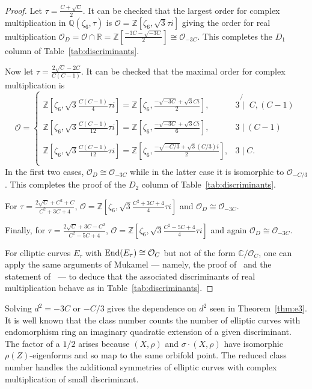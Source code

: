 \documentclass[a4paper,11pt]{amsart}
\numberwithin{equation}{section}
\numberwithin{figure}{section}
\numberwithin{table}{section}
\newcommand{\C}{\mathbb{C}}
\newcommand{\Z}{\mathbb{Z}}
\newcommand{\R}{\mathbb{R}}
\newcommand{\Q}{\mathbb{Q}}
\DeclareMathOperator{\End}{{\rm{End}}}
\begin{document}
\begin{proof}
    Let $\tau = \frac{C+\sqrt{C}}{2}$. It can be checked that the largest order for complex multiplication in $\Q(\zeta_6,\tau)$ is $\mathcal{O} = \Z[\zeta_6,\sqrt{3}\tau i]$ giving the order for real multiplication $\mathcal{O}_{D} = \mathcal{O}\cap\R = \Z\left[\frac{-3C-\sqrt{-3C}}{2}\right]\cong\mathcal{O}_{-3C}$. This completes the $D_{1}$ column of Table~\ref{tab:discriminants}.

    Now let $\tau = \frac{2\sqrt{C}-2C}{C(C-1)}$. It can be checked that the maximal order for complex multiplication is
    \[\mathcal{O} = \left\lbrace\begin{array}{ll}
        \Z\left[\zeta_{6},\sqrt{3}\frac{C(C-1)}{4}\tau i\right] = \Z\left[\zeta_6,\frac{-\sqrt{-3C}+\sqrt{3}Ci}{2}\right], & 3 \not{\mid}\,\,C,(C-1) \\
        \\
        \Z\left[\zeta_{6},\sqrt{3}\frac{C(C-1)}{12}\tau i\right]= \Z\left[\zeta_6,\frac{-\sqrt{-3C}+\sqrt{3}Ci}{6}\right], & 3 \mid (C-1) \\
        \\
        \Z\left[\zeta_{6},\sqrt{3}\frac{C(C-1)}{12}\tau i\right]= \Z\left[\zeta_6,\frac{-\sqrt{-C/3}+\sqrt{3}(C/3)i}{2}\right], & 3 \mid C. \\
    \end{array}\right.\]
    In the first two cases, $\mathcal{O}_{D}\cong\mathcal{O}_{-3C}$ while in the latter case it is isomorphic to $\mathcal{O}_{-C/3}$. This completes the proof of the $D_{2}$ column of Table~\ref{tab:discriminants}.

    For $\tau = \frac{2\sqrt{C}+C^2+C}{C^2+3C+4}$, $\mathcal{O} = \Z\left[\zeta_6,\sqrt{3}\frac{C^2+3C+4}{4}\tau i\right]$ and $\mathcal{O}_{D}\cong\mathcal{O}_{-3C}.$

    Finally, for $\tau = \frac{2\sqrt{C}+3C-C^2}{C^2-5C+4}$, $\mathcal{O} = \Z\left[\zeta_6,\sqrt{3}\frac{C^2-5C+4}{4}\tau i\right]$ and again $\mathcal{O}_{D}\cong\mathcal{O}_{-3C}.$

    For elliptic curves $E_{\tau}$ with $\End(E_\tau)\cong\mathcal{O}_{C}$ but not of the form $\C/\mathcal{O}_{C}$, one can apply the same arguments of Mukamel --- namely, the proof of~\cite[Proposition 4.4]{Muk} and the statement of~\cite[Proposition 4.5]{Muk} --- to deduce that the associated discriminants of real multiplication behave as in Table~\ref{tab:discriminants}.
\end{proof}

Solving $d^2 = -3C$ or $-C/3$ gives the dependence on $d^2$ seen in Theorem~\ref{thm:e3}. It is well known that the class number counts the number of elliptic curves with endomorphism ring an imaginary quadratic extension of a given discriminant. The factor of a $1/2$ arises because $(X,\rho)$ and $\sigma\cdot(X,\rho)$ have isomorphic $\rho(Z)$-eigenforms and so map to the same orbifold point. The reduced class number handles the additional symmetries of elliptic curves with complex multiplication of small discriminant.
\end{document}
